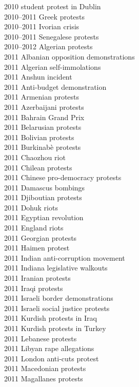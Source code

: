 2010 student protest in Dublin\\
2010–2011 Greek protests\\
2010–2011 Ivorian crisis\\
2010–2011 Senegalese protests\\
2010–2012 Algerian protests\\
2011 Albanian opposition demonstrations\\
2011 Algerian self-immolations\\
2011 Anshun incident\\
2011 Anti-budget demonstration\\
2011 Armenian protests\\
2011 Azerbaijani protests\\
2011 Bahrain Grand Prix\\
2011 Belarusian protests\\
2011 Bolivian protests\\
2011 Burkinabè protests\\
2011 Chaozhou riot\\
2011 Chilean protests\\
2011 Chinese pro-democracy protests\\
2011 Damascus bombings\\
2011 Djiboutian protests\\
2011 Dohuk riots\\
2011 Egyptian revolution\\
2011 England riots\\
2011 Georgian protests\\
2011 Haimen protest\\
2011 Indian anti-corruption movement\\
2011 Indiana legislative walkouts\\
2011 Iranian protests\\
2011 Iraqi protests\\
2011 Israeli border demonstrations\\
2011 Israeli social justice protests\\
2011 Kurdish protests in Iraq\\
2011 Kurdish protests in Turkey\\
2011 Lebanese protests\\
2011 Libyan rape allegations\\
2011 London anti-cuts protest\\
2011 Macedonian protests\\
2011 Magallanes protests\\
